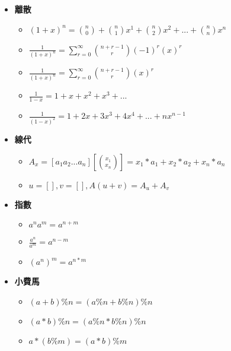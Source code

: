 \begin{itemize}
\item \textbf{離散}
  \begin{itemize}
    \item $(1+x)^n = \binom{n}{0} + \binom{n}{1}x^1 + \binom{n}{2}x^2 + ...+\binom{n}{n}x^n$
    \item $\frac{1}{(1+x)^n} = \sum \limits_{r=0}^\infty \binom{n+r-1}{r}(-1)^r(x)^r$
    \item $\frac{1}{(1+x)^n} = \sum \limits_{r=0}^\infty \binom{n+r-1}{r}(x)^r$
    \item $\frac{1}{1-x} = 1+x+x^2+x^3+...$
    \item $\frac{1}{(1-x)^2} = 1+2x+3x^3+4x^4+...+nx^{n-1}$
  \end{itemize}
  
\item \textbf{線代}
  \begin{itemize}
    \item $A_x = [a_1 a_2 ... a_n][\binom{x_1}{x_n}] = x_1*a_1+x_2*a_2+x_n*a_n$
    \item $u=[], v=[], A(u+v) = A_u+A_v$
  \end{itemize}

  \item \textbf{指數}
  \begin{itemize}
    \item $a^na^m = a^{n+m}$
    \item $\frac{a^n}{a^m} = a^{n-m}$
    \item $(a^n)^m = a^{n*m}$
  \end{itemize}

  \item \textbf{小費馬}
  \begin{itemize}
    \item $(a+b)\%n = (a\%n+b\%n)\%n$
    \item $(a*b)\%n = (a\%n*b\%n)\%n$
    \item $a*(b\%m) = (a*b)\%m$
  \end{itemize}
\end{itemize}
